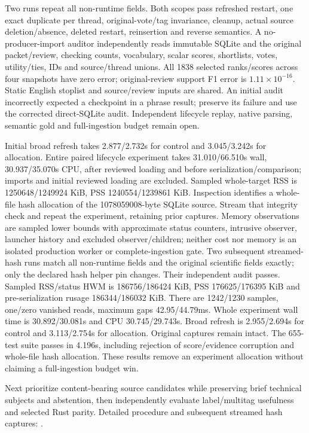 \documentclass[11pt]{article}
\begin{document}
Two runs repeat all non-runtime fields. Both scopes pass refreshed restart,
one exact duplicate per thread, original-vote/tag invariance, cleanup, actual
source deletion/absence, deleted restart, reinsertion and reverse semantics.
A no-producer-import auditor independently reads immutable SQLite and the
original packet/review, checking counts, vocabulary, scalar scores, shortlists,
votes, utility/ties, IDs and source/thread unions. All 1838 selected ranks/scores
across four snapshots have zero error; original-review support F1 error is
$1.11\times10^{-16}$. Static English stoplist and source/review inputs are shared.
An initial audit incorrectly expected a checkpoint in a phrase result; preserve
its failure and use the corrected direct-SQLite audit. Independent lifecycle
replay, native parsing, semantic gold and full-ingestion budget remain open.

Initial broad refresh takes 2.877/2.732s for control and 3.045/3.242s for
allocation. Entire paired lifecycle experiment takes 31.010/66.510s wall,
30.937/35.070s CPU, after reviewed loading and before serialization/comparison;
imports and initial reviewed loading are excluded. Sampled whole-target RSS is
1250648/1249924 KiB, PSS 1240554/1239861 KiB. Inspection identifies a whole-file
hash allocation of the 1078059008-byte SQLite source. Stream that integrity
check and repeat the experiment, retaining prior captures. Memory observations
are sampled lower bounds with approximate status counters, intrusive observer,
launcher history and excluded observer/children; neither cost nor memory is an
isolated production worker or complete-ingestion gate.
Two subsequent streamed-hash runs match all non-runtime fields and the original
scientific fields exactly; only the declared hash helper pin changes. Their
independent audit passes. Sampled RSS/status HWM is 186756/186424 KiB,
PSS 176625/176395 KiB and pre-serialization rusage 186344/186032 KiB.
There are 1242/1230 samples, one/zero vanished reads, maximum gaps
42.95/44.79ms. Whole experiment wall time is 30.892/30.081s and CPU
30.745/29.743s. Broad refresh is 2.955/2.694s for control and 3.113/2.754s
for allocation. Original captures remain intact. The 655-test suite passes
in 4.196s, including rejection of score/evidence corruption and whole-file
hash allocation. These results remove an experiment allocation without
claiming a full-ingestion budget win.

Next prioritize content-bearing source candidates while preserving brief
technical subjects and abstention, then independently evaluate label/multitag
usefulness and selected Rust parity. Detailed procedure and subsequent streamed
hash captures: .
\end{document}
